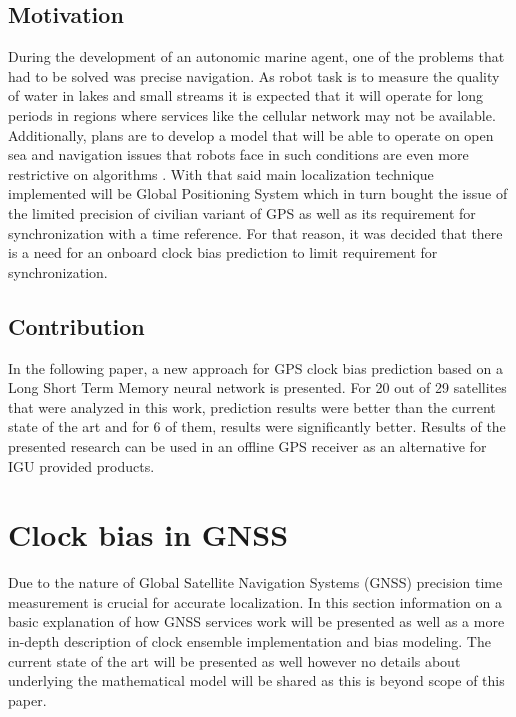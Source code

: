 \documentclass{article}
\begin{document}
\subsection{Motivation}
During the development of an autonomic marine agent, one of the problems that had to be solved was precise navigation. As robot task is to measure the quality of water in lakes and small streams
it is expected that it will operate for long periods in regions where services like 
the cellular network may not be available. Additionally, plans are to develop a model that
will be able to operate on open sea and navigation issues that robots face in such conditions
are even more restrictive on algorithms \cite{Cabrera2014}. 
With that said main localization technique implemented
will be Global Positioning System which in turn bought the issue of the limited precision of civilian
 variant of GPS as well as its requirement for synchronization with a time reference.
For that reason, it was decided that there is a need for an onboard clock bias prediction to limit
requirement for synchronization.

\subsection{Contribution}
In the following paper, a new approach for GPS clock bias prediction based on a Long Short Term Memory
neural network is presented. For 20 out of 29 satellites that were analyzed in this work, 
prediction results were better than the current state of the art and for 6 of them, results were
significantly better. Results of the presented research can be used in an offline GPS receiver as an alternative for IGU provided products.


\FloatBarrier
\section{Clock bias in GNSS}
Due to the nature of Global Satellite Navigation Systems (GNSS) 
precision time measurement is crucial for accurate localization.
In this section information on a basic explanation of how GNSS services work will be presented
as well as a more in-depth description of clock ensemble implementation and bias modeling.
The current state of the art will be presented as well however no details about underlying the mathematical model will be shared as this is beyond scope of this paper.
\end{document}
